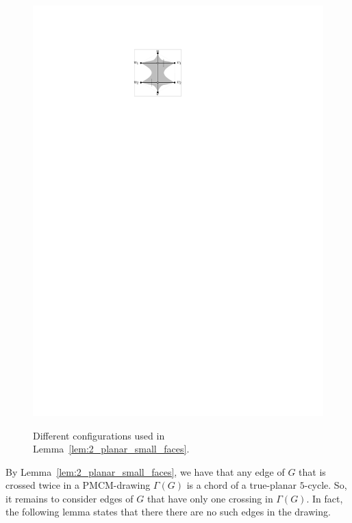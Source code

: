\begin{figure}[htb]
\begin{minipage}[b]{.24\textwidth}
        \includegraphics[width=\textwidth,page=7]{images/2_planar_potential_parallel}
        \subcaption{~}\label{fig:2_planar_one_parallel_final}
    \end{minipage}
    \caption{%
    Different configurations used in Lemma~\ref{lem:2_planar_small_faces}.}
    \label{fig:2_planar_potential_parallel}
\end{figure}




By Lemma~\ref{lem:2_planar_small_faces}, we have that any edge of $G$ that is 
crossed twice in a PMCM-drawing $\Gamma(G)$ is a chord of a true-planar 
$5$-cycle. So, it remains to consider edges of $G$ that have only one crossing 
in $\Gamma(G)$. In fact, the following lemma states that there there are 
no such edges in the drawing.

